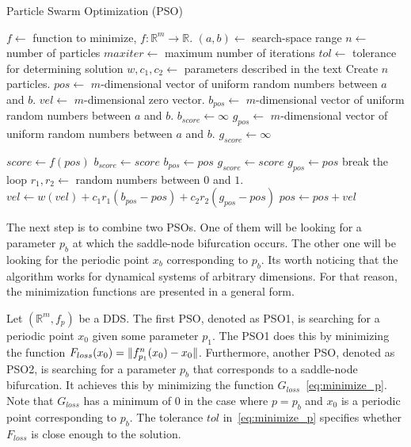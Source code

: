 \begin{algorithm}[!h]
    \caption{Particle Swarm Optimization (PSO)}
    \label{alg:pso}
    \begin{algorithmic}[1]
        \Statex $f \gets$ function to minimize, $f: \mathbb{R}^{m} \rightarrow \mathbb{R}$.
        \Statex $(a, b) \gets$ search-space range
        \Statex $n \gets$ number of particles
        \Statex $maxiter \gets$ maximum number of iterations
        \Statex $tol \gets$ tolerance for determining solution
        \Statex $w, c_{1}, c_{2} \gets$ parameters described in the text
        \State Create $n$ particles.
            \State $pos \gets$ $m$-dimensional vector of uniform random numbers between $a$ and $b$.
            \State $vel \gets$ $m$-dimensional zero vector.
            \State $b_{pos} \gets$ $m$-dimensional vector of uniform random numbers between $a$ and $b$.
            \State $b_{score} \gets \infty$
        \EndFor
        \State $g_{pos} \gets$ $m$-dimensional vector of uniform random numbers between $a$ and $b$.
        \State $g_{score} \gets \infty$

                \State $score \gets f(pos)$ 
                    \State $b_{score} \gets score$
                    \State $b_{pos} \gets pos$
                \EndIf
                    \State $g_{score} \gets score$
                    \State $g_{pos} \gets pos$
                \EndIf
            \EndFor
                \State break the loop
            \EndIf
                \State $r_{1}, r_{2} \gets$ random numbers between $0$ and $1$.
                \State $vel \gets w(vel) + c_{1}r_{1}(b_{pos}-pos) + c_{2}r_{2}(g_{pos}-pos)$
                \State $pos \gets pos + vel$
            \EndFor
        \EndFor
    \end{algorithmic}
\end{algorithm}

\par
The next step is to combine two PSOs.
One of them will be looking for a parameter $p_b$ at which the saddle-node bifurcation occurs.
The other one will be looking for the periodic point $x_b$ corresponding to $p_b$.
Its worth noticing that the algorithm works for dynamical systems of arbitrary dimensions.
For that reason, the minimization functions are presented in a general form.
\par
Let $(\mathbb{R}^{m}, f_{p})$ be a DDS.
The first PSO, denoted as PSO1, is searching for a periodic point $x_0$ given some parameter $p_{1}$.
The PSO1 does this by minimizing the function $F_{loss}(x_0) = \lVert f^{n}_{p_{1}}(x_0)-x_0\rVert$.
Furthermore, another PSO, denoted as PSO2, is searching for a parameter $p_{b}$ that corresponds to a saddle-node bifurcation.
It achieves this by minimizing the function $G_{loss}$~\eqref{eq:minimize_p}.
Note that $G_{loss}$ has a minimum of $0$ in the case where $p = p_{b}$ and $x_{0}$ is a periodic point corresponding to $p_{b}$.
The tolerance $tol$ in~\eqref{eq:minimize_p} specifies whether $F_{loss}$ is close enough to the solution.

